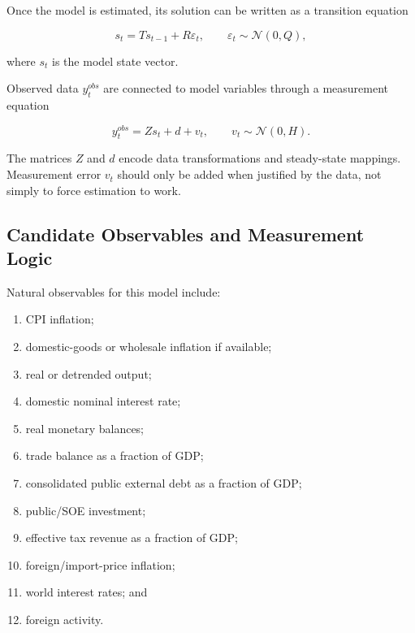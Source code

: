 Once the model is estimated, its solution can be written as a transition
equation

\begin{equation}
s_t
=
Ts_{t-1}
+
R\varepsilon_t,
\qquad
\varepsilon_t\sim\mathcal N(0,Q),
\label{eq:transition}
\end{equation}

where \(s_t\) is the model state vector.

Observed data \(y_t^{obs}\) are connected to model variables through a
measurement equation

\begin{equation}
y_t^{obs}
=
Zs_t
+
d
+
v_t,
\qquad
v_t\sim\mathcal N(0,H).
\label{eq:measurement}
\end{equation}

The matrices \(Z\) and \(d\) encode data transformations and steady-state
mappings. Measurement error \(v_t\) should only be added when justified by the
data, not simply to force estimation to work.

\subsection{Candidate Observables and Measurement Logic}
\label{app:observables}

Natural observables for this model include:

\begin{enumerate}
    \item CPI inflation;
    \item domestic-goods or wholesale inflation if available;
    \item real or detrended output;
    \item domestic nominal interest rate;
    \item real monetary balances;
    \item trade balance as a fraction of GDP;
    \item consolidated public external debt as a fraction of GDP;
    \item public/SOE investment;
    \item effective tax revenue as a fraction of GDP;
    \item foreign/import-price inflation;
    \item world interest rates; and
    \item foreign activity.
\end{enumerate}

